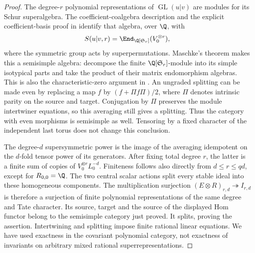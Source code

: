 \begin{proof}
The degree-$r$ polynomial representations of
$\operatorname{GL}(u|v)$ are modules for its Schur superalgebra.
The coefficient-coalgebra description and the explicit
coefficient-basis proof in
\citet[section~5, (5.2), Lemma~5.1 and Theorem~5.2,
author pp.~13--15]{c_brundankujawa2003}
identify that algebra, over $\Q$, with
\[
 S(u|v,r)=\End_{\Q[\mathfrak S_r]}(V_0^{\otimes r}),
\]
where the symmetric group acts by superpermutations.
Maschke's theorem makes this a semisimple algebra: decompose the
finite $\Q[\mathfrak S_r]$-module into its simple isotypical
parts and take the product of their matrix endomorphism algebras.
This is also the characteristic-zero argument in
\citet[Theorem~1.3.1(a)(i), proof of Theorem~4.2.6(a),
author pp.~3 and~12]{c_hemmerkujawanakano2006}.
An ungraded splitting can be made even by replacing a map $f$
by $(f+\Pi f\Pi)/2$, where $\Pi$ denotes intrinsic parity on the
source and target.  Conjugation by $\Pi$ preserves the module
intertwiner equations, so this averaging still gives a splitting.
Thus the category with even morphisms is semisimple as well.
Tensoring by a fixed character of the independent last torus does
not change this conclusion.

The degree-$d$ supersymmetric power is the image of the averaging
idempotent on the $d$-fold tensor power of its generators.  After
fixing total degree $r$, the latter is a finite sum of copies of
$V_0^{\otimes r}L_0^{-d}$.  Finiteness follows also directly from
$d\leq r\leq qd$, except for $R_{0,0}=\Q$.
The two central scalar actions split every stable ideal into
these homogeneous components.  The multiplication surjection
$(E\otimes R)_{r,d}\twoheadrightarrow I_{r,d}$ is therefore a
surjection of finite polynomial representations of the same
degree and Tate character.  Its source, target and the source of
the displayed Hom functor belong to the semisimple category just
proved.  It splits, proving the assertion.  Intertwining and
splitting impose finite rational linear equations.  We have used
exactness in the covariant polynomial category, not exactness of
invariants on arbitrary mixed rational superrepresentations.
\end{proof}

